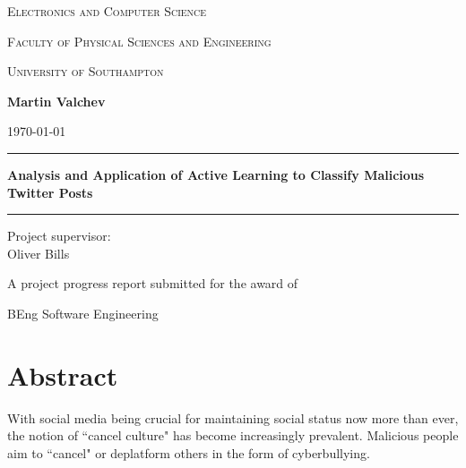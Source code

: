 \documentclass[a4paper,12pt]{article}
\begin{document}
	\begin{titlepage}
	
		\centering
	
		{\large \scshape Electronics and Computer Science \par}
		{\large \scshape Faculty of Physical Sciences and Engineering \par}
		{\large \scshape University of Southampton \par}
		\vspace{3cm}
		
		{\Large \textbf{Martin Valchev} \par} %
		\vspace{0.25cm}
		{\large \today \par}
		
		\vfill
		
		\hrule height 0.4pt
		\vspace{1cm}
			\huge
			\textbf{Analysis and Application of Active Learning to Classify Malicious Twitter Posts} %
		\vspace{1cm}
		\hrule height 1.2pt
		
		\vfill
		
		{\Large Project supervisor: \\ Oliver Bills \par} %
		\vspace{0.5cm}
	
		\vfill
		
		{\Large A project progress report submitted for the award of \par} %
		{\LARGE BEng Software Engineering \par} %
		\vspace{4cm}
	
	\end{titlepage}

\section*{Abstract}
With social media being crucial for maintaining social status now more than ever, the notion of ``cancel culture" has become increasingly prevalent. Malicious people aim to ``cancel" or deplatform others in the form of cyberbullying.
\end{document}
